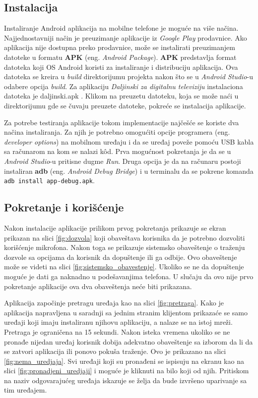 \documentclass[implementacija.tex]{subfiles}
\begin{document}
\subsection{Instalacija}
Instaliranje Android aplikacija na mobilne telefone je moguće na više načina. Najjednostavniji način je preuzimanje aplikacije iz \textit{Google Play} prodavnice. Ako aplikacija nije dostupna preko prodavnice, može se instalirati preuzimanjem datoteke u formatu \textbf{APK} (eng. \textit{Android Package}). \textbf{APK} predstavlja format datoteka koji OS Android koristi za instaliranje i distribuciju aplikacija. Ova datoteka se kreira u \textit{build} direktorijumu projekta nakon što se u \textit{Android Studio}-u odabere opcija \textit{build}. Za aplikaciju \textit{Daljinski za digitalnu televiziju} instalaciona datoteka je daljinski.apk \cite{sajt:daljiskiApk}. Klikom na preuzetu datoteku, koja se može naći u direktorijumu gde se čuvaju preuzete datoteke, pokreće se instalacija aplikacije.

Za potrebe testiranja aplikacije tokom implementacije najčešće se koriste dva načina instaliranja. Za njih je potrebno omogućiti opcije programera (eng. \textit{developer options}) na mobilnom uređaju i da se uređaj poveže pomoću USB kabla sa računarom na kom se nalazi k\^{o}d. Prva mogućnost pokretanja je da se u \textit{Android Studio}-u pritisne dugme \textit{Run}. Druga opcija je da na računaru postoji instaliran \textbf{adb} (eng. \textit{Android Debug Bridge}) i u terminalu da se pokrene komanda \verb|adb install app-debug.apk|. 

\subsection{Pokretanje i korišćenje}

Nakon instalacije aplikacije prilikom prvog pokretanja prikazuje se ekran prikazan na slici \ref{fig:dozvola} koji obaveštava korisnika da je potrebno dozvoliti korišćenje mikrofona. Nakon toga se prikazuje sistemsko obaveštenje o traženju dozvole sa opcijama da korisnik da dopuštenje ili ga odbije. Ovo obaveštenje može se videti na slici \ref{fig:sistemsko_obavestenje}. Ukoliko se ne da dopuštenje moguće je dati ga naknadno u podešavanjima telefona. U slučaju da ovo nije prvo pokretanje aplikacije ova dva obaveštenja neće biti prikazana.

Aplikacija započinje pretragu uređaja kao na slici \ref{fig:pretraga}. Kako je aplikacija napravljena u saradnji sa jednim stranim klijentom prikazaće se samo uređaji koji imaju instaliranu njihovu aplikaciju, a nalaze se na istoj mreži. Pretraga je ograničena na 15 sekundi. Nakon isteka vremena ukoliko se ne pronađe nijedan uređaj korisnik dobija adekvatno obaveštenje sa izborom da li da se zatvori aplikacija ili ponovo pokuša traženje. Ovo je prikazano na slici \ref{fig:nema_uredjaja}. 
Svi uređaji koji su pronađeni se ispisuju na ekranu kao na slici \ref{fig:pronadjeni_uredjaji} i moguće je kliknuti na bilo koji od njih. Pritiskom na naziv odgovarajućeg uređaja iskazuje se želja da bude izvršeno uparivanje sa tim uređajem.
\end{document}
